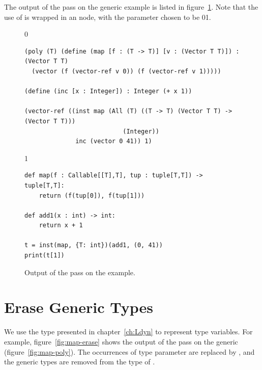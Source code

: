 \documentclass[7x10]{TimesAPriori_MIT}%
\def\racketEd{0}
\def\pythonEd{1}
\def\edition{1}
\newcommand{\racket}[1]{{\if\edition\racketEd{#1}\fi}}
\newcommand{\pythonColor}[0]{}
\newcommand{\python}[1]{{\if\edition\pythonEd\pythonColor #1\fi}}
\numberwithin{theorem}{chapter}
\numberwithin{definition}{chapter}
\numberwithin{equation}{chapter}
\begin{document}
The output of the  pass on the generic 
example is listed in figure~\ref{fig:map-resolve}. Note that the use
of  is wrapped in an  node, with the parameter
 chosen to be \racket{}\python{}.

\begin{figure}[tbp]
\begin{tcolorbox}[colback=white]  
{\if\edition\racketEd    
\begin{lstlisting}
(poly (T) (define (map [f : (T -> T)] [v : (Vector T T)]) : (Vector T T)
  (vector (f (vector-ref v 0)) (f (vector-ref v 1)))))

(define (inc [x : Integer]) : Integer (+ x 1))

(vector-ref ((inst map (All (T) ((T -> T) (Vector T T) -> (Vector T T)))
                           (Integer))
              inc (vector 0 41)) 1)
\end{lstlisting}
\fi}
{\if\edition\pythonEd\pythonColor
\begin{lstlisting}
def map(f : Callable[[T],T], tup : tuple[T,T]) -> tuple[T,T]:
    return (f(tup[0]), f(tup[1]))

def add1(x : int) -> int:
    return x + 1

t = inst(map, {T: int})(add1, (0, 41))
print(t[1])
\end{lstlisting}
\fi}
\end{tcolorbox}
\caption{Output of the  pass on the  example.}
\label{fig:map-resolve}
\end{figure}

\section{Erase Generic Types}
\label{sec:erase_types}

We use the \CANYTY{} type presented in chapter~\ref{ch:Ldyn} to
represent type variables. For example, figure~\ref{fig:map-erase}
shows the output of the  pass on the generic
 (figure~\ref{fig:map-poly}). The occurrences of
type parameter  are replaced by \CANYTY{}, and the generic
 types are removed from the type of . 
\end{document}

